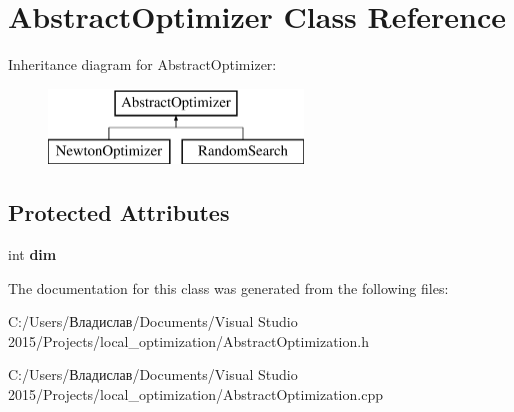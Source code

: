 \section{Abstract\+Optimizer Class Reference}
\label{class_abstract_optimizer}
Inheritance diagram for Abstract\+Optimizer\+:\begin{figure}[H]
\begin{center}
\leavevmode
\includegraphics[height=2.000000cm]{class_abstract_optimizer}
\end{center}
\end{figure}
\subsection*{Protected Attributes}
\begin{DoxyCompactItemize}
\item 
\mbox{\label{class_abstract_optimizer_a200df06dc7a52d2c7ba97e26dad29025}} 
int {\bfseries dim}
\end{DoxyCompactItemize}


The documentation for this class was generated from the following files\+:\begin{DoxyCompactItemize}
\item 
C\+:/\+Users/Владислав/\+Documents/\+Visual Studio 2015/\+Projects/local\+\_\+optimization/Abstract\+Optimization.\+h\item 
C\+:/\+Users/Владислав/\+Documents/\+Visual Studio 2015/\+Projects/local\+\_\+optimization/Abstract\+Optimization.\+cpp\end{DoxyCompactItemize}
